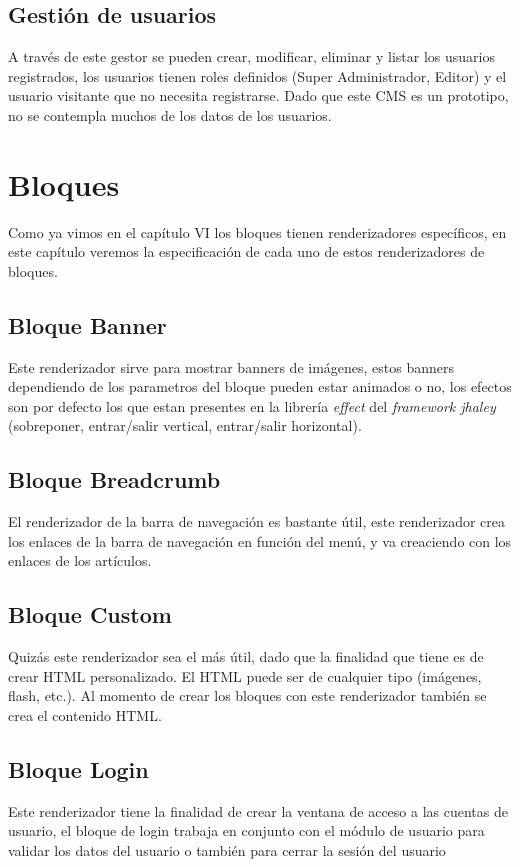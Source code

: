 \subsection{Gesti\'on de usuarios}
A trav\'es de este gestor se pueden crear, modificar, eliminar y listar los usuarios registrados, los usuarios tienen roles definidos (Super Administrador, Editor) y el usuario visitante que no necesita registrarse. Dado que este CMS es un prototipo, no se contempla muchos de los datos de los usuarios.

\section{Bloques}
Como ya vimos en el cap\'itulo VI los bloques tienen renderizadores espec\'ificos, en este cap\'itulo veremos la especificaci\'on de cada uno de estos renderizadores de bloques.

\subsection{Bloque Banner}
Este renderizador sirve para mostrar banners de im\'agenes, estos banners dependiendo de los parametros del bloque pueden estar animados o no, los efectos son por defecto los que estan presentes en la librer\'ia \textit{effect} del \textit{framework jhaley} (sobreponer, entrar/salir vertical, entrar/salir horizontal).

\subsection{Bloque Breadcrumb}
El renderizador de la barra de navegaci\'on es bastante \'util, este renderizador crea los enlaces de la barra de navegaci\'on en funci\'on del men\'u, y va creaciendo con los enlaces de los art\'iculos.

\subsection{Bloque Custom}
Quiz\'as este renderizador sea el m\'as \'util, dado que la finalidad que tiene es de crear HTML personalizado. El HTML puede ser de cualquier tipo (im\'agenes, flash, etc.). Al momento de crear los bloques con este renderizador tambi\'en se crea el contenido HTML.

\subsection{Bloque Login}
Este renderizador tiene la finalidad de crear la ventana de acceso a las cuentas de usuario, el bloque de login trabaja en conjunto con el m\'odulo de usuario para validar los datos del usuario o tambi\'en para cerrar la sesi\'on del usuario

